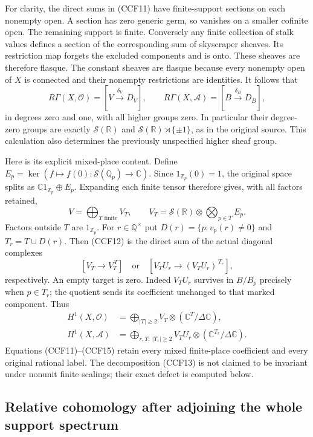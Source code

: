 \documentclass[11pt,a4paper]{article}
\theoremstyle{definition}\newtheorem{definition}[theorem]{Definition}
\begin{document}
For clarity, the direct sums in (CCF11) have finite-support
sections on each nonempty open. A section has zero generic germ,
so vanishes on a smaller cofinite open. The remaining support is
finite. Conversely any finite collection of stalk values defines
a section of the corresponding sum of skyscraper sheaves. Its
restriction map forgets the excluded components and is onto.
These sheaves are therefore flasque. The constant sheaves are
flasque because every nonempty open of $X$ is connected and
their nonempty restrictions are identities. It follows that
\[
 R\Gamma(X,\mathcal O)=[V\xrightarrow{\delta_V}D_V],\qquad
 R\Gamma(X,\mathcal A)=[B\xrightarrow{\delta_B}D_B],
 \tag{CCF12}
\]
in degrees zero and one, with all higher groups zero. In
particular their degree-zero groups are exactly
$\mathcal S(\mathbb R)$ and $\mathcal S(\mathbb R)\rtimes\{\pm1\}$,
as in the original source. This calculation also determines the
previously unspecified higher sheaf group.

Here is its explicit mixed-place content. Define
$E_p=\ker(f\mapsto f(0):\mathcal S(\mathbb Q_p)\to\mathbb C)$.
Since $1_{\mathbb Z_p}(0)=1$, the original space splits as
$\mathbb C1_{\mathbb Z_p}\oplus E_p$. Expanding each finite
tensor therefore gives, with all factors retained,
\[
 V=\bigoplus_{T\text{ finite}}V_T,\qquad
 V_T=\mathcal S(\mathbb R)\otimes\bigotimes_{p\in T}E_p.
 \tag{CCF13}
\]
Factors outside $T$ are $1_{\mathbb Z_p}$. For $r\in\mathbb Q^\times$
put $D(r)=\{p:v_p(r)\ne0\}$ and $T_r=T\cup D(r)$. Then (CCF12)
is the direct sum of the actual diagonal complexes
\[
 [V_T\longrightarrow V_T^{\,T}]
 \quad\text{or}\quad
 [V_TU_r\longrightarrow (V_TU_r)^{\,T_r}],
 \tag{CCF14}
\]
respectively. An empty target is zero. Indeed $V_TU_r$ survives
in $B/B_p$ precisely when $p\in T_r$; the quotient sends its
coefficient unchanged to that marked component. Thus
\[
 \begin{aligned}
 H^1(X,\mathcal O)&=\bigoplus_{|T|\ge2}
       V_T\otimes(\mathbb C^T/\Delta\mathbb C),\\
 H^1(X,\mathcal A)&=\bigoplus_{r,T:\ |T_r|\ge2}
       V_TU_r\otimes(\mathbb C^{T_r}/\Delta\mathbb C).
 \end{aligned}
 \tag{CCF15}
\]
Equations (CCF11)--(CCF15) retain every mixed finite-place
coefficient and every original rational label. The decomposition
(CCF13) is not claimed to be invariant under nonunit finite
scalings; their exact defect is computed below.

\subsection{Relative cohomology after adjoining the whole support spectrum}
\end{document}
